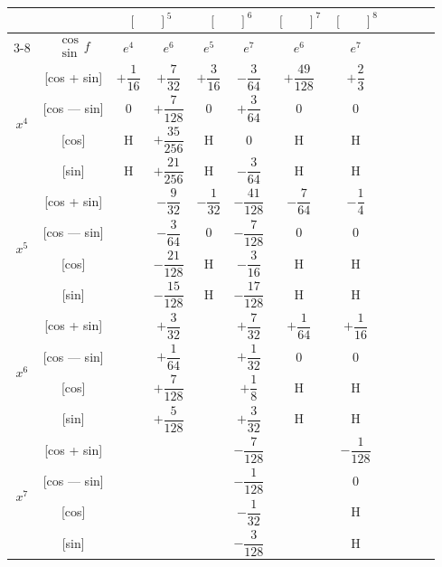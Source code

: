\documentclass[11pt,a4paper]{book}
\begin{document}
\newpage


\begin{center}
\small
\begin{tabular}{|c|c|c|c|c|c|c|c|c|c|c|c|}
\hline
& & \multicolumn{2}{c|}{$[\phantom{()}]^5$} & \multicolumn{2}{c|}{$[\phantom{()}]^6$} & \multicolumn{1}{c|}{$[\phantom{()}]^7$} & \multicolumn{1}{c|}{$[\phantom{()}]^8$} \\
\cline{3-8}
& $\begin{smallmatrix} \cos \\ \sin \end{smallmatrix} f$ & $e^4$ & $e^6$ & $e^5$ & $e^7$ & $e^6$ & $e^7$ \\
\hline
\multirow{4}{*}{$x^4$} & [cos + sin] & $+\dfrac{1}{16}$ & $+\dfrac{7}{32}$ & $+\dfrac{3}{16}$ & $-\dfrac{3}{64}$ & $+\dfrac{49}{128}$ & $+\dfrac{2}{3}$ \\
& [cos --- sin] & $0$ & $+\dfrac{7}{128}$ & $0$ & $+\dfrac{3}{64}$ & $0$ & $0$ \\
& [cos] & H & $+\dfrac{35}{256}$ & H & $0$ & H & H \\
& [sin] & H & $+\dfrac{21}{256}$ & H & $-\dfrac{3}{64}$ & H & H \\
\hline
\multirow{4}{*}{$x^5$} & [cos + sin] & & $-\dfrac{9}{32}$ & $-\dfrac{1}{32}$ & $-\dfrac{41}{128}$ & $-\dfrac{7}{64}$ & $-\dfrac{1}{4}$ \\
& [cos --- sin] & & $-\dfrac{3}{64}$ & $0$ & $-\dfrac{7}{128}$ & $0$ & $0$ \\
& [cos] & & $-\dfrac{21}{128}$ & H & $-\dfrac{3}{16}$ & H & H \\
& [sin] & & $-\dfrac{15}{128}$ & H & $-\dfrac{17}{128}$ & H & H \\
\hline
\multirow{4}{*}{$x^6$} & [cos + sin] & & $+\dfrac{3}{32}$ & & $+\dfrac{7}{32}$ & $+\dfrac{1}{64}$ & $+\dfrac{1}{16}$ \\
& [cos --- sin] & & $+\dfrac{1}{64}$ & & $+\dfrac{1}{32}$ & $0$ & $0$ \\
& [cos] & & $+\dfrac{7}{128}$ & & $+\dfrac{1}{8}$ & H & H \\
& [sin] & & $+\dfrac{5}{128}$ & & $+\dfrac{3}{32}$ & H & H \\
\hline
\multirow{4}{*}{$x^7$} & [cos + sin] & & & & $-\dfrac{7}{128}$ & & $-\dfrac{1}{128}$ \\
& [cos --- sin] & & & & $-\dfrac{1}{128}$ & & $0$ \\
& [cos] & & & & $-\dfrac{1}{32}$ & & H \\
& [sin] & & & & $-\dfrac{3}{128}$ & & H \\
\hline
\end{tabular}
\end{center}
\end{document}
